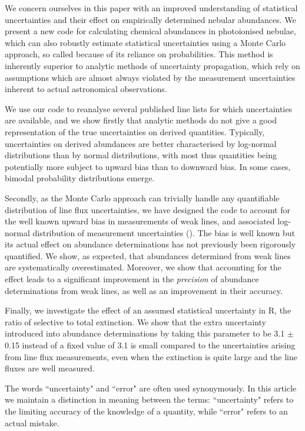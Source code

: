 \documentclass[useAMS,usenatbib]{mn2e}
\begin{document}
We concern ourselves in this paper with an improved understanding of statistical uncertainties and their effect on empirically determined nebular abundances.  We present a new code for calculating chemical abundances in photoionised nebulae, which can also robustly estimate statistical uncertainties using a Monte Carlo approach, so called because of its reliance on probabilities.  This method is inherently superior to analytic methods of uncertainty propagation, which rely on assumptions which are almost always violated by the measurement uncertainties inherent to actual astronomical observations.

We use our code to reanalyse several published line lists for which uncertainties are available, and we show firstly that analytic methods do not give a good representation of the true uncertainties on derived quantities.  Typically, uncertainties on derived abundances are better characterised by log-normal distributions than by normal distributions, with most thus quantities being potentially more subject to upward bias than to downward bias.  In some cases, bimodal probability distributions emerge.

Secondly, as the Monte Carlo approach can trivially handle any quantifiable distribution of line flux uncertainties, we have designed the code to account for the well known upward bias in measurements of weak lines, and associated log-normal distribution of measurement uncertainties (\citet{1994A&A...287..676R}).  The bias is well known but its actual effect on abundance determinations has not previously been rigorously quantified.  We show, as expected, that abundances determined from weak lines are systematically overestimated.  Moreover, we show that accounting for the effect leads to a significant improvement in the {\it precision} of abundance determinations from weak lines, as well as an improvement in their accuracy.

Finally, we investigate the effect of an assumed statistical uncertainty in R, the ratio of selective to total extinction.  We show that the extra uncertainty introduced into abundance determinations by taking this parameter to be 3.1 $\pm$ 0.15 instead of a fixed value of 3.1 is small compared to the uncertainties arising from line flux measurements, even when the extinction is quite large and the line fluxes are well measured.

The words ``uncertainty" and ``error" are often used synonymously.  In this article we maintain a distinction in meaning between the terms: ``uncertainty" refers to the limiting accuracy of the knowledge of a quantity, while ``error" refers to an actual mistake.
\end{document}
